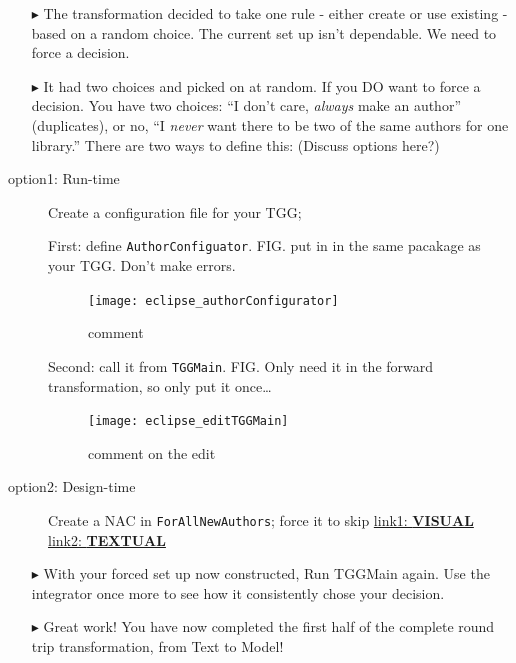 \begin{itemize}
\item[$\blacktriangleright$] The transformation decided to take one rule - either create or use existing - based on a random choice. The current set up isn't
dependable. We need to force a decision.

\item[$\blacktriangleright$] It had two choices and picked on at random. If you DO want to force a decision. You have two choices: ``I
don't care, \emph{always} make an author'' (duplicates), or no, ``I \emph{never} want there to be two of the same authors for one library.'' There are two ways
to define this: (Discuss options here?)

\end{itemize}

\begin{description}

\item[option1: Run-time] Create a configuration file for your TGG;

First: define \texttt{AuthorConfiguator}. FIG. put in in the same pacakage as your TGG. Don't make errors.

\begin{figure}[htbp]
\begin{center}
  \texttt{[image: eclipse\_authorConfigurator]}
  \caption{comment}
  \label{eclipse:authorConfig}
\end{center}
\end{figure}

Second: call it from \texttt{TGGMain}. FIG. Only need it in the forward transformation, so only put it once\ldots

\begin{figure}[htbp]
\begin{center}
  \texttt{[image: eclipse\_editTGGMain]}
  \caption{comment on the edit}
  \label{eclipse:editTGGMain}
\end{center}
\end{figure}

\item[option2: Design-time] Create a NAC in \texttt{ForAllNewAuthors}; force it to skip
\hyperlink{NAC vis}{link1: {\bf VISUAL}}
\hyperlink{NAC tex}{link2: {\bf TEXTUAL}}





\end{description}

\newpage
\begin{itemize}

\item[$\blacktriangleright$] With your forced set up now constructed, Run TGGMain again. Use the integrator once more to see how it consistently chose your
decision.

\item[$\blacktriangleright$] Great work! You have now completed the first half of the complete round trip transformation, from Text to Model!

\end{itemize}

